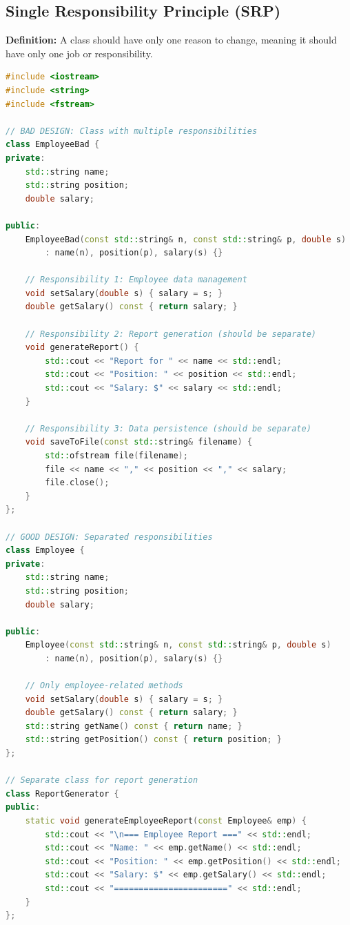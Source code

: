 \documentclass[12pt,a4paper]{article}
\newcommand{\important}[1]{\textbf{\textcolor{accent}{#1}}}
\begin{document}
\subsection{Single Responsibility Principle (SRP)}
\label{subsec:srp}

\important{Definition:} A class should have only one reason to change, meaning it should have only one job or responsibility.

\begin{lstlisting}[language=C++, caption={Single Responsibility Principle Example}, label=lst:srp]
#include <iostream>
#include <string>
#include <fstream>

// BAD DESIGN: Class with multiple responsibilities
class EmployeeBad {
private:
    std::string name;
    std::string position;
    double salary;
    
public:
    EmployeeBad(const std::string& n, const std::string& p, double s)
        : name(n), position(p), salary(s) {}
    
    // Responsibility 1: Employee data management
    void setSalary(double s) { salary = s; }
    double getSalary() const { return salary; }
    
    // Responsibility 2: Report generation (should be separate)
    void generateReport() {
        std::cout << "Report for " << name << std::endl;
        std::cout << "Position: " << position << std::endl;
        std::cout << "Salary: $" << salary << std::endl;
    }
    
    // Responsibility 3: Data persistence (should be separate)
    void saveToFile(const std::string& filename) {
        std::ofstream file(filename);
        file << name << "," << position << "," << salary;
        file.close();
    }
};

// GOOD DESIGN: Separated responsibilities
class Employee {
private:
    std::string name;
    std::string position;
    double salary;
    
public:
    Employee(const std::string& n, const std::string& p, double s)
        : name(n), position(p), salary(s) {}
    
    // Only employee-related methods
    void setSalary(double s) { salary = s; }
    double getSalary() const { return salary; }
    std::string getName() const { return name; }
    std::string getPosition() const { return position; }
};

// Separate class for report generation
class ReportGenerator {
public:
    static void generateEmployeeReport(const Employee& emp) {
        std::cout << "\n=== Employee Report ===" << std::endl;
        std::cout << "Name: " << emp.getName() << std::endl;
        std::cout << "Position: " << emp.getPosition() << std::endl;
        std::cout << "Salary: $" << emp.getSalary() << std::endl;
        std::cout << "=======================" << std::endl;
    }
};


\end{lstlisting}
\end{document}

